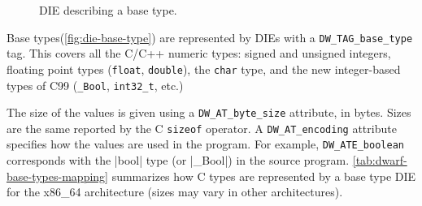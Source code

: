 \begin{figure}
  \centering
  \caption{DIE describing a base type.}
  \label{fig:die-base-type}
\end{figure}


Base types(\autoref{fig:die-base-type}) are represented by DIEs with
a \verb|DW_TAG_base_type| tag. This covers all the C/C++ numeric types: signed
and unsigned integers, floating point types (\texttt{float},
\texttt{double}), the \texttt{char} type, and the new
integer-based types of C99 (\texttt{_Bool}, \texttt{int32_t},
etc.)

The size of the values is given using a \verb|DW_AT_byte_size| attribute,
in bytes. Sizes are the same reported by the C \texttt{sizeof}
operator. A \verb|DW_AT_encoding| attribute specifies how the values are
used in the program. For example, \verb|DW_ATE_boolean|
corresponds with the \Mc|bool| type (or \Mc|_Bool|) in the
source program. \autoref{tab:dwarf-base-types-mapping} summarizes how C
types are represented by a base type DIE for the x86\_64 architecture
(sizes may vary in other architectures).

